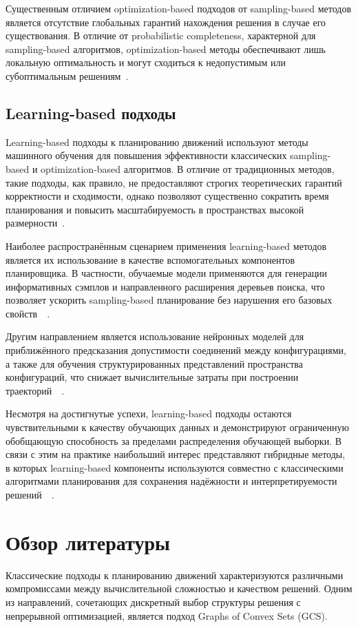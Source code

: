 \documentclass[a4paper,12pt]{extarticle}
\begin{document}
Существенным отличием optimization-based подходов от sampling-based
методов является отсутствие глобальных гарантий нахождения решения в
случае его существования. В отличие от probabilistic completeness,
характерной для sampling-based алгоритмов, optimization-based методы
обеспечивают лишь локальную оптимальность и могут сходиться к
недопустимым или субоптимальным решениям~\cite{15}.

\subsection{Learning-based подходы}
Learning-based подходы к планированию движений используют методы
машинного обучения для повышения эффективности классических
sampling-based и optimization-based алгоритмов. В отличие от
традиционных методов, такие подходы, как правило, не предоставляют
строгих теоретических гарантий корректности и сходимости, однако
позволяют существенно сократить время планирования и повысить
масштабируемость в пространствах высокой размерности~\cite{19}.

Наиболее распространённым сценарием применения learning-based методов
является их использование в качестве вспомогательных компонентов
планировщика. В частности, обучаемые модели применяются для генерации
информативных сэмплов и направленного расширения деревьев поиска, что
позволяет ускорить sampling-based планирование без нарушения его
базовых свойств~\cite{20}~\cite{21}.

Другим направлением является использование нейронных моделей для
приближённого предсказания допустимости соединений между
конфигурациями, а также для обучения структурированных представлений
пространства конфигураций, что снижает вычислительные затраты при
построении траекторий~\cite{22}~\cite{23}.

Несмотря на достигнутые успехи, learning-based подходы остаются
чувствительными к качеству обучающих данных и демонстрируют ограниченную
обобщающую способность за пределами распределения обучающей выборки. В
связи с этим на практике наибольший интерес представляют гибридные
методы, в которых learning-based компоненты используются совместно с
классическими алгоритмами планирования для сохранения надёжности и
интерпретируемости решений~\cite{21}~\cite{23}.


\section{Обзор литературы}
Классические подходы к планированию движений характеризуются различными
компромиссами между вычислительной сложностью и качеством решений. Одним
из направлений, сочетающих дискретный выбор структуры решения с
непрерывной оптимизацией, является подход Graphs of Convex Sets (GCS).
\end{document}
